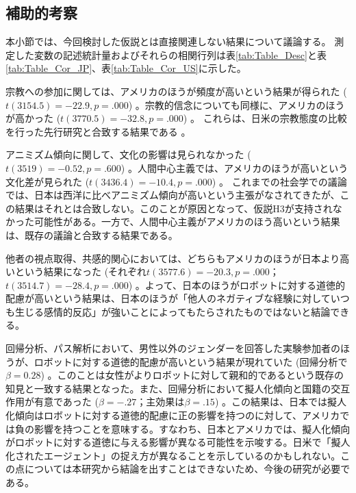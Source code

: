 \documentclass[a4j,12pt]{jreport}
\begin{document}
\subsection{補助的考察}
本小節では、今回検討した仮説とは直接関連しない結果について議論する。
測定した変数の記述統計量およびそれらの相関行列は表\ref{tab:Table_Desc}と表\ref{tab:Table_Cor_JP}、表\ref{tab:Table_Cor_US}に示した。



宗教への参加に関しては、アメリカのほうが頻度が高いという結果が得られた ($t(3154.5) = -22.9, p = .000$) 。宗教的信念についても同様に、アメリカのほうが高かった ($t(3770.5) = -32.8, p = .000$) 。
これらは、日米の宗教態度の比較を行った先行研究と合致する結果である\cite{kava} 。



アニミズム傾向に関して、文化の影響は見られなかった ($t(3519) = -0.52, p = .600$) 。人間中心主義では、アメリカのほうが高いという文化差が見られた ($t(3436.4) = -10.4, p = .000$) 。
これまでの社会学での議論では、日本は西洋に比べアニミズム傾向が高いという主張がなされてきた\cite{hosaka}が、この結果はそれとは合致しない。このことが原因となって、仮説H3が支持されなかった可能性がある。一方で、人間中心主義がアメリカのほう高いという結果は、既存の議論\cite{abe}と合致する結果である。


他者の視点取得、共感的関心においては、どちらもアメリカのほうが日本より高いという結果になった (それぞれ$t(3577.6) = -20.3, p = .000$；$t(3514.7) = -28.4, p = .000$) 。よって、日本のほうがロボットに対する道徳的配慮が高いという結果は、日本のほうが「他人のネガティブな経験に対していつも生じる感情的反応」が強いことによってもたらされたものではないと結論できる。


回帰分析、パス解析において、男性以外のジェンダーを回答した実験参加者のほうが、ロボットに対する道徳的配慮が高いという結果が現れていた (回帰分析で$\beta=0.28$) 。このことは女性がよりロボットに対して親和的であるという既存の知見\cite{gend, gend2}と一致する結果となった。また、回帰分析において擬人化傾向と国籍の交互作用が有意であった ($\beta=-.27$；主効果は$\beta=.15$) 。この結果は、日本では擬人化傾向はロボットに対する道徳的配慮に正の影響を持つのに対して、アメリカでは負の影響を持つことを意味する。すなわち、日本とアメリカでは、擬人化傾向がロボットに対する道徳に与える影響が異なる可能性を示唆する。日米で「擬人化されたエージェント」の捉え方が異なることを示しているのかもしれない。この点については本研究から結論を出すことはできないため、今後の研究が必要である。
\end{document}
